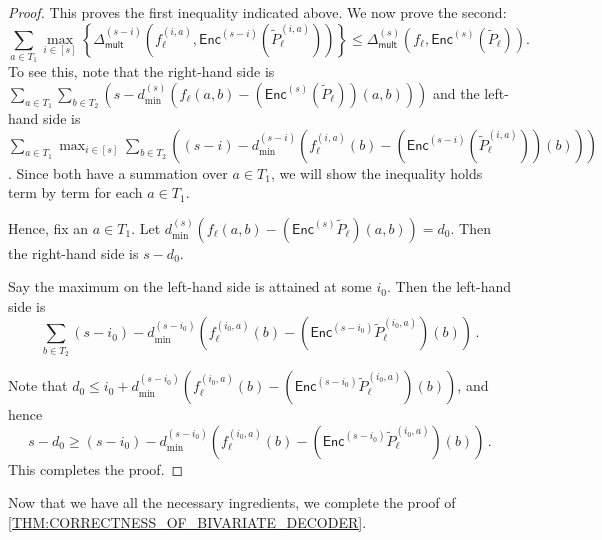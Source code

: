\documentclass{article}
\newtheorem{theorem}{Theorem}\newtheorem{lemma}[theorem]{Lemma}\newtheorem{proposition}[theorem]{Proposition}\newtheorem{corollary}[theorem]{Corollary}\newtheorem{definition}[theorem]{Definition}\newtheorem{claim}[theorem]{Claim}\newtheorem{remark}[theorem]{Remark}\newtheorem{observation}[theorem]{Observation}
\def\Natural{\mathbb{N}}
\def\Field{\mathbb{F}}
\let\N\Natural
\let\F\Field
\renewcommand{\tilde}[1]{\widetilde{#1}}
\newcommand{\enc}{{\mathsf{Enc}}}
\newcommand{\encs}{{\mathsf{Enc}^{(s)}}}
\newcommand{\Delm}{\Delta_{\mathsf{mult}}}
\begin{document}
\begin{proof}
		This proves the first inequality indicated above. We now prove the second:
		\[ 
		\sum_{a \in T_1} \max_{i \in [s]} \left\{\Delm^{(s-i)} \left(f_{\ell}^{(i,a)}, \enc^{(s-i)}\left(\tilde{P}_{\ell}^{(i,a)}\right)\right)  \right\} \leq \Delm^{(s)} \left(f_\ell, \encs\left( \tilde{P}_\ell\right)\right).
		\]
		To see this, note that the right-hand side is $\sum_{a \in T_1} \sum_{b \in T_2} \left(s-d_{\min}^{(s)}\left(f_\ell(a, b)-\left(\enc^{(s)}\left(\tilde{P}_\ell\right)\right)\left(a, b\right)\right)\right)$ and the left-hand side is $\sum_{a \in T_1} \max_{i \in [s]} \sum_{b \in
			T_2} \left((s-i) - d_{\min}^{(s-i)} \left(f_{\ell}^{(i,a)}(b) - \left(\enc^{(s-i)}\left(\tilde{P}_{\ell}^{(i,a)}\right)\right)\left(b\right)\right)\right)$. Since both
		have a summation over $a \in T_1$, we will show the inequality holds
		term by term for each $a \in T_1$. 
		
		Hence, fix an $a \in T_1$. Let $d_{\min}^{(s)}\left(f_\ell(a, b) -
		\left(\enc^{(s)} \tilde{P}_\ell\right)\left(a, b\right)\right) = d_0$. Then the right-hand side is $s-d_0$.
		
		Say the maximum on the left-hand side is
		attained at some $i_0$. Then the
		left-hand side is \[\sum_{b \in T_2} (s-i_0) -
		d_{\min}^{(s-i_0)}\left(f_{\ell}^{(i_0, a)}(b) - \left(\enc^{(s-i_0)}\tilde{P}_{\ell}^{(i_0,
			a)}\right)(b)\right)\,.\] 
		
		Note that $d_0\leq i_0 +
		d_{\min}^{(s-i_0)}\left(f_\ell^{(i_0, a)}(b) - \left(\enc^{(s-i_0)}\tilde{P}_\ell^{(i_0,
			a)}\right)(b)\right)$, and hence \[s-d_0 \geq (s-i_0) -
		d_{\min}^{(s-i_0)}\left(f_\ell^{(i_0, a)}(b) - \left(\enc^{(s-i_0)}\tilde{P}_\ell^{(i_0,
			a)}\right)(b)\right)\,.\] 
		This completes the proof. \qedhere
	\end{proof}
	
	Now that we have all the necessary ingredients, we complete the proof
	of \cref{THM:CORRECTNESS_OF_BIVARIATE_DECODER}.
	
		
\end{document}
